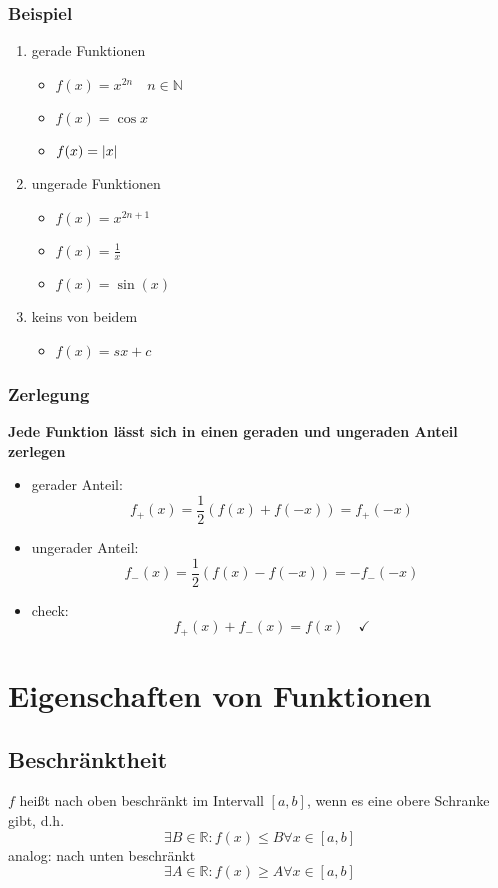 \documentclass[11pt]{article}
\DeclarePairedDelimiter\abs{\lvert}{\rvert}%
\DeclareMathOperator{\Forall}{\forall}
\begin{document}
\subsubsection{Beispiel}
\label{sec-7-2-1}
\begin{enumerate}
\item gerade Funktionen
\label{sec-7-2-1-1}
\begin{itemize}
\item $f(x) = x^{2n}\quad n\in\mathbb{N}$
\item $f(x) = \cos{x}$
\item $f(x) = \abs{x}$
\end{itemize}
\item ungerade Funktionen
\label{sec-7-2-1-2}
\begin{itemize}
\item $f(x) = x^{2n + 1}$
\item $f(x)=\frac{1}{x}$
\item $f(x)=\sin(x)$
\end{itemize}
\item keins von beidem
\label{sec-7-2-1-3}
\begin{itemize}
\item $f(x) = s x + c$
\end{itemize}
\end{enumerate}
\subsubsection{Zerlegung}
\label{sec-7-2-2}

\textbf{Jede Funktion lässt sich in einen geraden und ungeraden Anteil zerlegen}
\begin{itemize}
\item gerader Anteil: \[f_+(x)=\frac{1}{2}\left(f(x) + f(-x)\right)=f_+(-x)\]
\item ungerader Anteil: \[f_-(x)=\frac{1}{2}\left(f(x)-f(-x)\right)=-f_-(-x)\]
\item check: \[f_+(x) + f_-(x)=f(x)\quad\checkmark\]
\end{itemize}
\section{Eigenschaften von Funktionen}
\label{sec-8}
\subsection{Beschränktheit}
\label{sec-8-1}
$f$ heißt nach oben beschränkt im Intervall $[a,b]$, wenn es eine obere Schranke gibt, d.h. \[\exists B\in\mathbb{R}: f(x)\leq B\Forall x\in [a,b]\]
analog: nach unten beschränkt \[\exists A\in\mathbb{R}: f(x)\geq A\Forall x\in [a,b]\]
\end{document}
